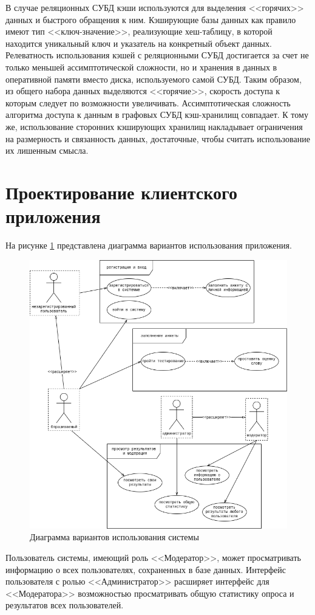 В случае реляционных СУБД кэши используются для выделения <<горячих>>  данных и быстрого обращения к ним. Кэширующие базы данных как правило имеют тип <<ключ-значение>>, реализующие хеш-таблицу, в которой находится уникальный ключ и указатель на конкретный объект данных. Релеватность использования кэшей с реляционными СУБД достигается за счет не только меньшей ассимптотической сложности, но и хранения в данных в оперативной памяти вместо диска, используемого самой СУБД.\cite{aws} Таким образом, из общего набора данных выделяются <<горячие>>, скорость доступа к которым следует по возможности увеличивать. Ассимптотическая сложность алгоритма доступа к данным в графовых СУБД кэш-хранилищ совпадает.
К тому же, использование сторонних кэширующих хранилищ накладывает ограничения на размерность и связанность данных, достаточные, чтобы считать использование их лишенным смысла.

\section{\protect\justifying\protect\RaggedRight Проектирование клиентского приложения}
На рисунке \ref{fig:usecase} представлена диаграмма вариантов использования приложения. 
\begin{center}
	\begin{figure}[H]
		\centering
		\includegraphics[width=0.85\linewidth]{assets/term-uc.drawio.png}
		\caption{Диаграмма вариантов использования системы}
		\label{fig:usecase}
	\end{figure}
\end{center}
Пользователь системы, имеющий роль <<Модератор>>, может просматривать информацию о всех пользователях, сохраненных в базе данных. Интерфейс пользователя с ролью <<Администратор>> расширяет интерфейс для <<Модератора>> возможностью просматривать общую статистику опроса и результатов всех пользователей.

